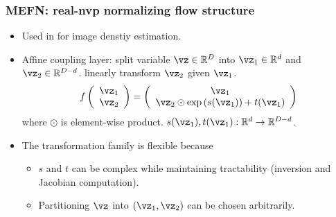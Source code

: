 \documentclass[16pt,presentation]{beamer}
\begin{document}
\begin{frame}
\frametitle{MEFN: real-nvp normalizing flow structure}
\begin{itemize}
\item Used in \textcite{dinh2016density} for image denstiy estimation.
\item Affine coupling layer: split variable $\vz \in \mathbb{R}^D$ into $\vz_1 \in \mathbb{R}^d$ and $\vz_2 \in \mathbb{R}^{D-d}$. linearly transform $\vz_2$ given $\vz_1$. 
\[f\left(\begin{array}{c} \vz_1\\ \vz_2 \end{array} \right) = 
\left(\begin{array}{c} \vz_1 \\ \vz_2 \odot \exp \left( s(\vz_1) \right) + t(\vz_1) \end{array}\right) \]
where $\odot$ is element-wise product. $s(\vz_1), t(\vz_1): \mathbb{R}^d \rightarrow \mathbb{R}^{D-d}$.
\item The transformation family is flexible because
\begin{itemize}
\item $s$ and $t$ can be complex while maintaining tractability (inversion and Jacobian computation). %
\item Partitioning $\vz$ into $(\vz_1, \vz_2)$ can be chosen arbitrarily.
\end{itemize}
\end{itemize}
\end{frame}
\end{document}
